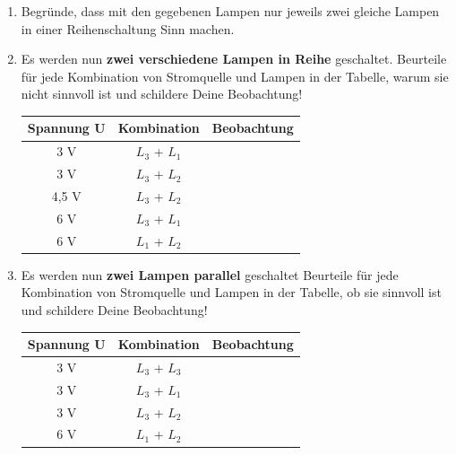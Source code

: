 \documentclass[a4paper]{article}
\begin{document}
\begin{enumerate}[1.]
\begin{minipage}{0.5\textwidth}
	 \renewcommand{\arraystretch}{2}
	 \begin{tabular}{|p{1.6 cm}|p{1.6 cm}|p{1.6 cm}|p{1.6 cm}|}
	 	\hline
	 	$U_{ges}$ & $I_{ges}$ &  $R_{ges}$ & $P_{ges}$  \\ 
	 	\hline
	 	&  &  &  \\
	 	\hline
	 \end{tabular}
\end{minipage}			
\vspace{0.5 cm}
	

\item Begründe, dass mit den gegebenen Lampen nur jeweils zwei gleiche Lampen in einer  Reihenschaltung Sinn machen.
\item Es werden nun {\bf zwei verschiedene Lampen in Reihe} geschaltet.
Beurteile für jede Kombination von Stromquelle und Lampen in der Tabelle, warum sie nicht sinnvoll ist und schildere Deine Beobachtung!

	\renewcommand{\arraystretch}{2}
\begin{tabular}{|c|c|p{12 cm}|}
	\hline
	Spannung  U & Kombination & Beobachtung  \\ 
	\hline
	3 V  &  $L_3$ + $L_1$  & \\
	\hline
	3 V  &  $L_3$ + $L_2$  & \\
	\hline
	4,5 V  &  $L_3$ + $L_2$  & \\
	\hline
	6 V  &  $L_3$ + $L_1$  & \\
	\hline
	6 V  &  $L_1$ + $L_2$  & \\
	\hline
\end{tabular}

\newpage 

\item Es werden nun {\bf zwei Lampen parallel} geschaltet
Beurteile für jede Kombination von Stromquelle und Lampen in der Tabelle, ob sie sinnvoll ist und schildere Deine Beobachtung!

\renewcommand{\arraystretch}{2}
\begin{tabular}{|c|c|p{12 cm}|}
	\hline
	Spannung  U & Kombination & Beobachtung  \\ 
	\hline
	3 V  &  $L_3$ + $L_3$  & \\
	\hline
	3 V  &  $L_3$ + $L_1$  & \\
	\hline
	3 V  &  $L_3$ + $L_2$  & \\
	\hline
	6 V  &  $L_1$ + $L_2$  & \\
	\hline
\end{tabular}

	\end{enumerate}
	
\end{document}
